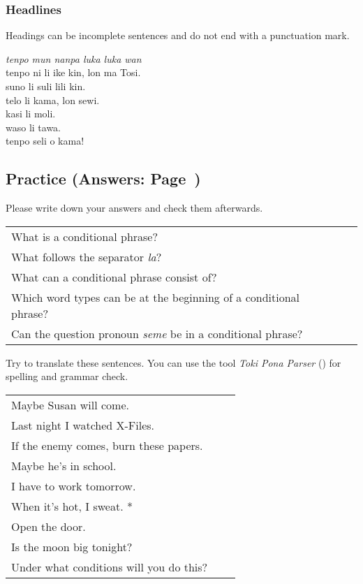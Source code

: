 \subsubsection*{Headlines}
Headings can be incomplete sentences and do not end with a punctuation mark.

\textit{tenpo mun nanpa luka luka wan} \\
tenpo ni li ike kin, lon ma Tosi. \\
suno li suli lili kin. \\
telo li kama, lon sewi. \\
kasi li moli. \\
waso li tawa. \\
tenpo seli o kama!

\newpage
\subsection*{Practice (Answers: Page~\pageref{'la'})}
Please write down your answers and check them afterwards.

\begin{supertabular}{p{5,5cm}|ll}
    What is a conditional phrase?                                      &  & \\
    What follows the separator \textit{la}?                            &  & \\
    What can a conditional phrase consist of?                          &  & \\
    Which word types can be at the beginning of a conditional phrase?  &  & \\
    Can the question pronoun \textit{seme} be in a conditional phrase? &  & \\
\end{supertabular}

Try to translate these sentences.
You can use the tool \textit{Toki Pona Parser} (\cite{www:rowa:02}) for spelling and grammar check.

\begin{supertabular}{p{5,5cm}|ll}
    Maybe Susan will come.                  &  & \\
    Last night I watched X-Files.           &  & \\
    If the enemy comes, burn these papers.  &  & \\
    Maybe he's in school.                   &  & \\
    I have to work tomorrow.                &  & \\
    When it's hot, I sweat. *               &  & \\
    Open the door.                          &  & \\
    Is the moon big tonight?                &  & \\
    Under what conditions will you do this? &  & \\
\end{supertabular}

